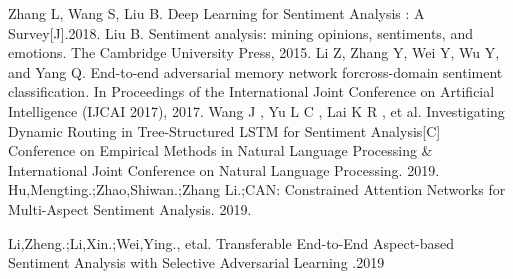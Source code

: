 \documentclass[twocolumn]{ctexart}
\begin{document}
\begin{thebibliography}{99}  
 Zhang L, Wang S, Liu B. Deep Learning for Sentiment Analysis : A Survey[J].2018.
 Liu  B.  Sentiment  analysis:  mining  opinions,  sentiments,  and  emotions.  The  Cambridge  University  Press, 2015.
Li  Z,  Zhang Y,  Wei  Y,  Wu  Y, and Yang  Q.  End-to-end  adversarial  memory  network  forcross-domain sentiment  classification.  In Proceedings  of  the  International  Joint  Conference  on  Artificial  Intelligence  (IJCAI 2017), 2017.  
Wang J , Yu L C , Lai K R , et al. Investigating Dynamic Routing in Tree-Structured LSTM for Sentiment Analysis[C] Conference on Empirical Methods in Natural Language Processing & International Joint Conference on Natural Language Processing. 2019.
 Hu,Mengting.;Zhao,Shiwan.;Zhang Li.;CAN: Constrained Attention Networks for Multi-Aspect Sentiment Analysis. 2019.

 Li,Zheng.;Li,Xin.;Wei,Ying., etal. Transferable End-to-End Aspect-based Sentiment Analysis with Selective Adversarial Learning .2019
\end{thebibliography}
\end{document}

